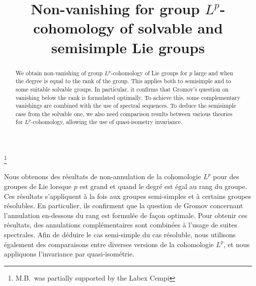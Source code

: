 \documentclass[JEP,XML,SOM,Unicode,published]{cedram}
\theoremstyle{plain}
\theoremstyle{remark}
\theoremstyle{definition}
\begin{document}
\frontmatter

\title{Non-vanishing for group $L^p$-cohomology of solvable and semisimple Lie groups}

\author[\initial{M.} \lastname{Bourdon}]{ }
\address{Laboratoire Paul Painlevé, UMR 8524 CNRS / Université de Lille\\
Cité Scientifique, Bât. M2, 59655 Villeneuve d'Ascq, France}

\author[\initial{B.} \lastname{Rémy}]{ }
\address{Unité de Mathématiques Pures et Appliquées, UMR 5669 CNRS / École normale supérieure de Lyon\\
46 allée d'Italie, 69364 Lyon cedex 07, France}
\urladdr{}

\thanks{M.B.\ was partially supported by the Labex Cempi}

\begin{abstract}
We obtain non-vanishing of group $L^p$-cohomology of Lie groups for $p$ large and when the degree is equal to the rank of the group. This applies both to semisimple and to some suitable solvable groups. In particular, it confirms that Gromov's question on vanishing below the rank is formulated optimally. To achieve this, some complementary vanishings are combined with the use of spectral sequences. To deduce the semisimple case from the solvable one, we also need comparison results between various theories for $L^p$-cohomology, allowing the use of quasi-isometry invariance.
\end{abstract}





\begin{altabstract}
Nous obtenons des résultats de non-annulation de la cohomologie $L^p$ pour des groupes de Lie lorsque $p$ est grand et quand le degré est égal au rang du groupe. Ces résultats s’appliquent à la fois aux groupes semi-simples et à certains groupes résolubles. En particulier, ils confirment que la question de Gromov concernant l’annulation en-dessous du rang est formulée de façon optimale. Pour obtenir ces résultats, des annulations complémentaires sont combinées à l’usage de suites spectrales. Afin de déduire le cas semi-simple du cas résoluble, nous utilisons également des comparaisons entre diverses versions de la cohomologie $L^p$, et nous appliquons l’invariance par quasi-isométrie.
\end{altabstract}
\end{document}
